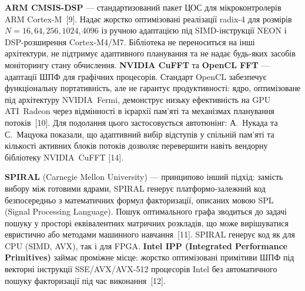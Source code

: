 \textbf{ARM CMSIS-DSP} --- стандартизований пакет ЦОС для
мікроконтролерів ARM Cortex-M~{[}9{]}. Надає жорстко оптимізовані
реалізації radix-4 для розмірів \(N = 16, 64, 256, 1024, 4096\) із
ручною адаптацією під SIMD-інструкції NEON і DSP-розширення
Cortex-M4/M7. Бібліотека не переноситься на інші архітектури, не
підтримує адаптивного планування та не надає будь-яких засобів
моніторингу стану обчислення. \textbf{NVIDIA CuFFT} та \textbf{OpenCL
FFT} --- адаптації ШПФ для графічних процесорів. Стандарт OpenCL
забезпечує функціональну портативність, але не гарантує продуктивності:
ядро, оптимізоване під архітектуру NVIDIA~Fermi, демонструє низьку
ефективність на GPU ATI~Radeon через відмінності в ієрархії пам'яті та
механізмах планування потоків~{[}10{]}. Для подолання цього
застосовується автотюнінг: А.~Нукада та С.~Мацуока показали, що
адаптивний вибір відступів у спільній пам'яті та кількості активних
блоків потоків дозволяє перевершити навіть вендорну бібліотеку
NVIDIA~CuFFT {[}14{]}.

\textbf{SPIRAL} (Carnegie Mellon University) --- принципово інший
підхід: замість вибору між готовими ядрами, SPIRAL генерує
платформо-залежний код безпосередньо з математичних формул факторизації,
описаних мовою SPL (Signal Processing Language). Пошук оптимального
графа зводиться до задачі пошуку у просторі еквівалентних матричних
розкладів, що може вирішуватися евристично або методами машинного
навчання~{[}11{]}. SPIRAL генерує код як для CPU (SIMD, AVX), так і для
FPGA. \textbf{Intel IPP (Integrated Performance Primitives)} займає
проміжне місце: жорстко оптимізовані примітиви ШПФ під векторні
інструкції SSE/AVX/AVX-512 процесорів Intel без автоматичного пошуку
факторизації під час виконання~{[}12{]}.

